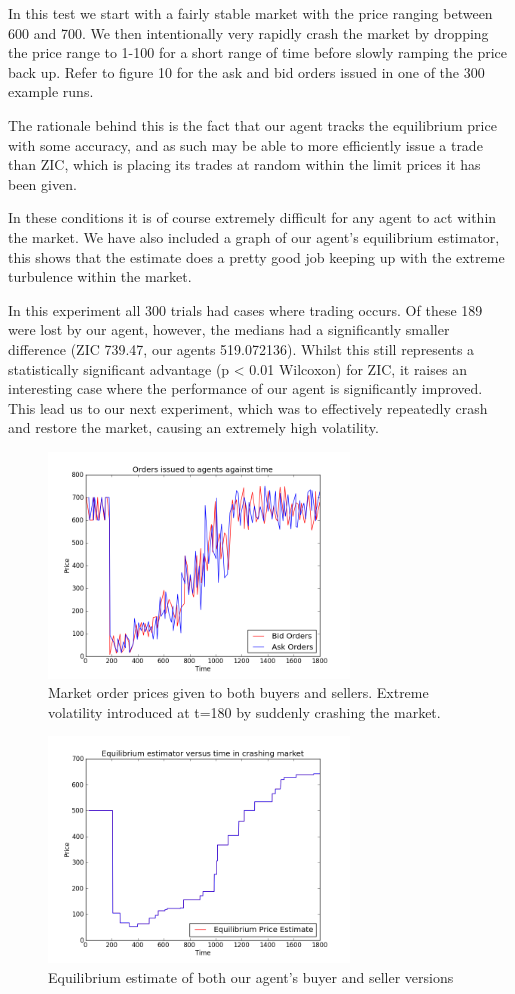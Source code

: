 \documentclass{acm_proc_article-sp}
\begin{document}
In this test we start with a fairly stable market with the price ranging
between 600 and 700. We then intentionally very rapidly crash the market by
dropping the price range to 1-100 for a short range of time before slowly
ramping the price back up.  Refer to figure 10 for the ask and bid orders
issued in one of the 300 example runs.

The rationale behind this is the fact that our agent tracks the equilibrium price
with some accuracy, and as such may be able to more efficiently issue a trade
than ZIC, which is placing its trades at random within the limit prices it has
been given.

In these conditions it is of course extremely difficult for any agent to act
within the market. We have also included a graph of our agent's equilibrium
estimator, this shows that the estimate does a pretty good job keeping up with
the extreme turbulence within the market.

In this experiment all 300 trials had cases where trading occurs. Of these 189
were lost by our agent, however, the medians had a significantly smaller
difference (ZIC 739.47, our agents 519.072136). Whilst this still represents a
statistically significant advantage (p < 0.01 Wilcoxon) for ZIC, it raises an
interesting case where the performance of our agent is significantly improved.
This lead us to our next experiment, which was to effectively repeatedly crash
and restore the market, causing an extremely high volatility.

\begin{figure}[h!] \includegraphics[width=80mm]{crash.png} \caption{Market
order prices given to both buyers and sellers. Extreme volatility introduced at
t=180 by suddenly crashing the market.} \end{figure}

\begin{figure}[h!]
\includegraphics[width=80mm]{crash2.png} \caption{Equilibrium estimate of both
our agent's buyer and seller versions} \end{figure}
\end{document}
